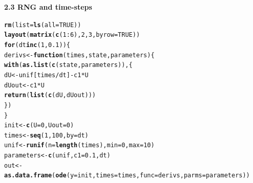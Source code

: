 \documentclass{article}\usepackage[]{graphicx}\usepackage[]{color}
\makeatletter
\newcommand{\hlnum}[1]{\textcolor[rgb]{0.686,0.059,0.569}{#1}}%
\newcommand{\hlopt}[1]{\textcolor[rgb]{0,0,0}{#1}}%
\newcommand{\hlstd}[1]{\textcolor[rgb]{0.345,0.345,0.345}{#1}}%
\newcommand{\hlkwa}[1]{\textcolor[rgb]{0.161,0.373,0.58}{\textbf{#1}}}%
\newcommand{\hlkwb}[1]{\textcolor[rgb]{0.69,0.353,0.396}{#1}}%
\newcommand{\hlkwc}[1]{\textcolor[rgb]{0.333,0.667,0.333}{#1}}%
\newcommand{\hlkwd}[1]{\textcolor[rgb]{0.737,0.353,0.396}{\textbf{#1}}}%
\newenvironment{kframe}{%
 \def\at@end@of@kframe{}%
 \ifinner\ifhmode%
  \def\at@end@of@kframe{\end{minipage}}%
  \begin{minipage}{\columnwidth}%
 \fi\fi%
 \def\FrameCommand##1{\hskip\@totalleftmargin \hskip-\fboxsep
 \colorbox{shadecolor}{##1}\hskip-\fboxsep
     \hskip-\linewidth \hskip-\@totalleftmargin \hskip\columnwidth}%
 \MakeFramed {\advance\hsize-\width
   \@totalleftmargin\z@ \linewidth\hsize
   \@setminipage}}%
 {\par\unskip\endMakeFramed%
 \at@end@of@kframe}
\newenvironment{knitrout}{}{} %
\makeatother
\begin{document}
\pagebreak
\bf{2.3 RNG and time-steps}
\begin{knitrout}
\color{fgcolor}\begin{kframe}
\begin{alltt}
\hlkwd{rm}\hlstd{(}\hlkwc{list} \hlstd{=} \hlkwd{ls}\hlstd{(}\hlkwc{all} \hlstd{=} \hlnum{TRUE}\hlstd{))}
\hlkwd{layout}\hlstd{(}\hlkwd{matrix}\hlstd{(}\hlkwd{c}\hlstd{(}\hlnum{1}\hlopt{:}\hlnum{6}\hlstd{),} \hlnum{2}\hlstd{,} \hlnum{3}\hlstd{,} \hlkwc{byrow} \hlstd{=} \hlnum{TRUE}\hlstd{))}
\hlkwa{for} \hlstd{(dt} \hlkwa{in} \hlkwd{c}\hlstd{(}\hlnum{1}\hlstd{,} \hlnum{0.1}\hlstd{)) \{}
    \hlstd{derivs} \hlkwb{<-} \hlkwa{function}\hlstd{(}\hlkwc{times}\hlstd{,} \hlkwc{state}\hlstd{,} \hlkwc{parameters}\hlstd{) \{}
        \hlkwd{with}\hlstd{(}\hlkwd{as.list}\hlstd{(}\hlkwd{c}\hlstd{(state, parameters)), \{}
            \hlstd{dU} \hlkwb{<-} \hlstd{unif[times}\hlopt{/}\hlstd{dt]} \hlopt{-} \hlstd{c1} \hlopt{*} \hlstd{U}
            \hlstd{dUout} \hlkwb{<-} \hlstd{c1} \hlopt{*} \hlstd{U}
            \hlkwd{return}\hlstd{(}\hlkwd{list}\hlstd{(}\hlkwd{c}\hlstd{(dU, dUout)))}
        \hlstd{\})}
    \hlstd{\}}
    \hlstd{init} \hlkwb{<-} \hlkwd{c}\hlstd{(}\hlkwc{U} \hlstd{=} \hlnum{0}\hlstd{,} \hlkwc{Uout} \hlstd{=} \hlnum{0}\hlstd{)}
    \hlstd{times} \hlkwb{<-} \hlkwd{seq}\hlstd{(}\hlnum{1}\hlstd{,} \hlnum{100}\hlstd{,} \hlkwc{by} \hlstd{= dt)}
    \hlstd{unif} \hlkwb{<-} \hlkwd{runif}\hlstd{(}\hlkwc{n} \hlstd{=} \hlkwd{length}\hlstd{(times),} \hlkwc{min} \hlstd{=} \hlnum{0}\hlstd{,} \hlkwc{max} \hlstd{=} \hlnum{10}\hlstd{)}
    \hlstd{parameters} \hlkwb{<-} \hlkwd{c}\hlstd{(unif,} \hlkwc{c1} \hlstd{=} \hlnum{0.1}\hlstd{, dt)}
    \hlstd{out} \hlkwb{<-} \hlkwd{as.data.frame}\hlstd{(}\hlkwd{ode}\hlstd{(}\hlkwc{y} \hlstd{= init,} \hlkwc{times} \hlstd{= times,} \hlkwc{func} \hlstd{= derivs,} \hlkwc{parms} \hlstd{= parameters))}


\end{alltt}
\end{kframe}
\end{knitrout}
\end{document}
